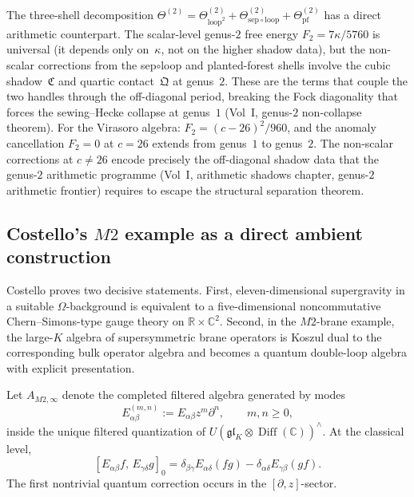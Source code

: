 \begin{remark}%
\label{rem:genus2-pf-arithmetic}%
%
The three-shell decomposition
$\Theta^{(2)} = \Theta^{(2)}_{\mathrm{loop}^2}
+ \Theta^{(2)}_{\mathrm{sep}\circ\mathrm{loop}}
+ \Theta^{(2)}_{\mathrm{pf}}$
has a direct arithmetic counterpart. The scalar-level
genus-$2$ free energy $F_2 = 7\kappa/5760$ is universal
(it depends only on~$\kappa$, not on the higher shadow
data), but the non-scalar corrections from the
sep$\circ$loop and planted-forest shells involve the cubic
shadow~$\mathfrak{C}$ and quartic contact~$\mathfrak{Q}$
at genus~$2$. These are the terms that couple the two
handles through the off-diagonal period, breaking the
Fock diagonality that forces the sewing--Hecke collapse at
genus~$1$ (Vol~I, genus-$2$ non-collapse theorem).
For the Virasoro algebra: $F_2 = (c{-}26)^2/960$, and the
anomaly cancellation $F_2 = 0$ at $c = 26$ extends from
genus~$1$ to genus~$2$. The non-scalar corrections at
$c \neq 26$ encode precisely the off-diagonal shadow data
that the genus-$2$ arithmetic programme
(Vol~I, arithmetic shadows chapter,
genus-$2$ arithmetic frontier)
requires to escape the structural separation theorem.
\end{remark}

\subsection{Costello's \texorpdfstring{$M2$}{M2} example as a direct ambient construction}
\label{subsec:m2-ambient-construction}

Costello proves two decisive statements. First, eleven-dimensional
supergravity in a suitable $\Omega$-background is equivalent to a
five-dimensional noncommutative Chern--Simons-type gauge theory on
$\mathbb{R} \times \mathbb{C}^2$. Second, in the $M2$-brane
example, the large-$K$ algebra of supersymmetric brane operators is
Koszul dual to the corresponding bulk operator algebra and becomes
a quantum double-loop algebra with explicit presentation.

\begin{definition}
\label{def:m2-boundary-algebra}
Let $A_{M2,\infty}$ denote the completed filtered algebra generated
by modes
\[
E^{(m,n)}_{\alpha\beta} := E_{\alpha\beta} z^m \partial^n,
\qquad m, n \geq 0,
\]
inside the unique filtered quantization of
$U(\mathfrak{gl}_K \otimes \operatorname{Diff}(\mathbb{C}))^{\wedge}$.
At the classical level,
\[
[E_{\alpha\beta}f,\, E_{\gamma\delta}g]_0
=
\delta_{\beta\gamma}E_{\alpha\delta}(fg)
- \delta_{\alpha\delta}E_{\gamma\beta}(gf).
\]
The first nontrivial quantum correction occurs in the
$[\partial, z]$-sector.
\end{definition}

